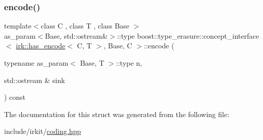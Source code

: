 \subsubsection{\texorpdfstring{encode()}{encode()}}
{\footnotesize\ttfamily template$<$class C , class T , class Base $>$ \\
as\+\_\+param$<$Base, std\+::ostream\&$>$\+::type boost\+::type\+\_\+erasure\+::concept\+\_\+interface$<$ \mbox{\hyperlink{structirk_1_1has__encode}{irk\+::has\+\_\+encode}}$<$ C, T $>$, Base, C $>$\+::encode (\begin{DoxyParamCaption}\item[{typename as\+\_\+param$<$ Base, T $>$\+::type}]{n,  }\item[{std\+::ostream \&}]{sink }\end{DoxyParamCaption}) const\hspace{0.3cm}{\ttfamily [inline]}}



The documentation for this struct was generated from the following file\+:\begin{DoxyCompactItemize}
\item 
include/irkit/\mbox{\hyperlink{coding_8hpp}{coding.\+hpp}}\end{DoxyCompactItemize}

